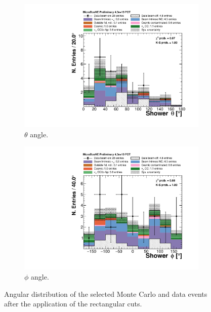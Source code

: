\begin{figure}
\centering
  \begin{subfigure}{0.48\textwidth}
    \includegraphics[width=\linewidth]{figures/theta_cuts.pdf}
    \caption{$\theta$ angle.} 
  \end{subfigure}
    \begin{subfigure}{0.48\textwidth}
    \includegraphics[width=\linewidth]{figures/phi_cuts.pdf}
    \caption{$\phi$ angle.} 
  \end{subfigure}
  \caption{Angular distribution of the selected Monte Carlo and data events after the application of the rectangular cuts.}
  \label{fig:angle_cuts}
\end{figure}



